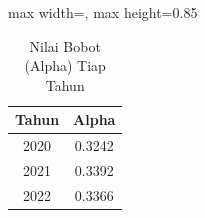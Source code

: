 \begin{table}[H]
\centering
\caption{Nilai Bobot (Alpha) Tiap Tahun} \label{tab:alpha}
\begin{adjustbox}{max width=\textwidth, max height=0.85\textheight}
\begin{tabular}{|c|c|}
\hline
\textbf{Tahun} & \textbf{Alpha} \\
\hline
2020 & 0.3242 \\
2021 & 0.3392 \\
2022 & 0.3366 \\
\hline
\end{tabular}
\end{adjustbox}
\end{table}